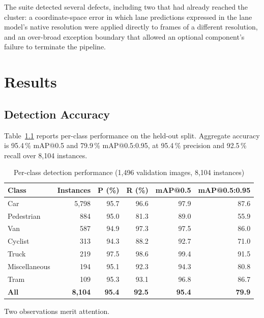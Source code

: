 \documentclass[11pt,a4paper]{report}
\begin{document}
The suite detected several defects, including two that had already reached the
cluster: a coordinate-space error in which lane predictions expressed in the
lane model's native resolution were applied directly to frames of a different
resolution, and an over-broad exception boundary that allowed an optional
component's failure to terminate the pipeline.

\chapter{Results}

\section{Detection Accuracy}

Table~\ref{tab:perclass} reports per-class performance on the held-out split.
Aggregate accuracy is 95.4\,\% mAP@0.5 and 79.9\,\% mAP@0.5:0.95, at 95.4\,\%
precision and 92.5\,\% recall over 8{,}104 instances.

\begin{table}[h]
\caption{Per-class detection performance (1{,}496 validation images,
8{,}104 instances)}
\label{tab:perclass}
\centering
\small
\begin{tabular}{lrrrrr}
\toprule
Class & Instances & P (\%) & R (\%) & mAP@0.5 & mAP@0.5:0.95 \\
\midrule
Car            & 5{,}798 & 95.7 & 96.6 & 97.9 & 87.6 \\
Pedestrian     &    884 & 95.0 & 81.3 & 89.0 & 55.9 \\
Van            &    587 & 94.9 & 97.3 & 97.5 & 86.0 \\
Cyclist        &    313 & 94.3 & 88.2 & 92.7 & 71.0 \\
Truck          &    219 & 97.5 & 98.6 & 99.4 & 91.5 \\
Miscellaneous  &    194 & 95.1 & 92.3 & 94.3 & 80.8 \\
Tram           &    109 & 95.3 & 93.1 & 96.8 & 86.7 \\
\midrule
\textbf{All}   & \textbf{8{,}104} & \textbf{95.4} & \textbf{92.5}
               & \textbf{95.4} & \textbf{79.9} \\
\bottomrule
\end{tabular}
\end{table}

Two observations merit attention.
\end{document}
